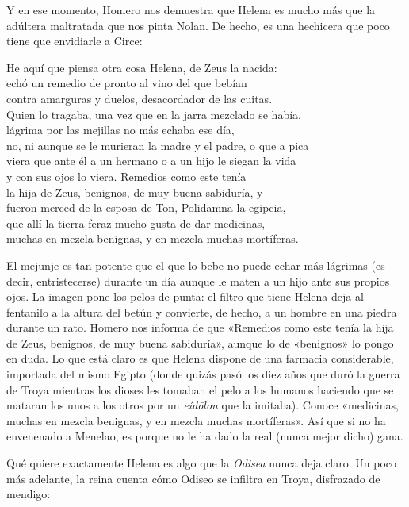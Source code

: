 Y en ese momento, Homero nos demuestra que Helena es mucho más que la adúltera maltratada que nos pinta Nolan. De hecho, es una hechicera que poco tiene que envidiarle a Circe:


\begin{versocita}
He aquí que piensa otra cosa Helena, de Zeus la nacida:\\
echó un remedio de pronto al vino del que bebían\\
contra amarguras y duelos, desacordador de las cuitas.\\
Quien lo tragaba, una vez que en la jarra mezclado se había,\\
lágrima por las mejillas no más echaba ese día,\\
no, ni aunque se le murieran la madre y el padre, o que a pica\\
viera que ante él a un hermano o a un hijo le siegan la vida\\
y con sus ojos lo viera. Remedios como este tenía\\
la hija de Zeus, benignos, de muy buena sabiduría, y\\
fueron merced de la esposa de Ton, Polidamna la egipcia,\\
que allí la tierra feraz mucho gusta de dar medicinas,\\
muchas en mezcla benignas, y en mezcla muchas mortíferas.
\end{versocita}

El mejunje es tan potente que el que lo bebe no puede echar más lágrimas (es decir, entristecerse) durante un día aunque le maten a un hijo ante sus propios ojos. La imagen pone los pelos de punta: el filtro que tiene Helena deja al fentanilo a la altura del betún y convierte, de hecho, a un hombre en una piedra durante un rato. Homero nos informa de que «Remedios como este tenía la hija de Zeus, benignos, de muy buena sabiduría», aunque lo de «benignos» lo pongo en duda. Lo que está claro es que Helena dispone de una farmacia considerable, importada del mismo Egipto (donde quizás pasó los diez años que duró la guerra de Troya mientras los dioses les tomaban el pelo a los humanos haciendo que se mataran los unos a los otros por un \emph{eídōlon} que la imitaba). Conoce «medicinas, muchas en mezcla benignas, y en mezcla muchas mortíferas». Así que si no ha envenenado a Menelao, es porque no le ha dado la real (nunca mejor dicho) gana.

Qué quiere exactamente Helena es algo que la \emph{Odisea} nunca deja claro. Un poco más adelante, la reina cuenta cómo Odiseo se infiltra en Troya, disfrazado de mendigo:

